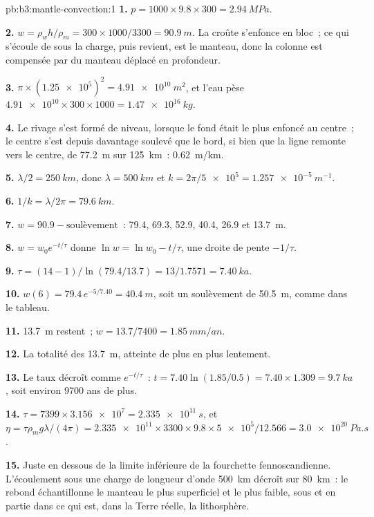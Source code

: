 \begin{solution}{pb:b3:mantle-convection:1}
\textbf{1.} $p = 1000\times9.8\times300 = \qty{2.94}{MPa}$.

\textbf{2.} $w = \rho_wh/\rho_m = 300\times1000/3300 = \qty{90.9}{m}$. La croûte
s'enfonce en bloc~; ce qui s'écoule de sous la charge, puis revient, est le
manteau, donc la colonne est compensée par du manteau déplacé en profondeur.

\textbf{3.} $\pi\times(\num{1.25e5})^2 = \qty{4.91e10}{m^2}$, et l'eau
pèse $\num{4.91e10}\times300\times1000 = \qty{1.47e16}{kg}$.

\textbf{4.} Le rivage s'est formé de niveau, lorsque le fond était le plus enfoncé au
centre~; le centre s'est depuis davantage soulevé que le bord, si bien que la ligne
remonte vers le centre, de \qty{77.2}{m} sur \qty{125}{km}~:
\qty{0.62}{m/km}.

\textbf{5.} $\lambda/2 = \qty{250}{km}$, donc $\lambda = \qty{500}{km}$ et $k =
2\pi/\num{5e5} = \qty{1.257e-5}{m^{-1}}$.

\textbf{6.} $1/k = \lambda/2\pi = \qty{79.6}{km}$.

\textbf{7.} $w = 90.9 - \text{soulèvement}$~: 79.4, 69.3, 52.9, 40.4, 26.9 et
\qty{13.7}{m}.

\textbf{8.} $w = w_0e^{-t/\tau}$ donne $\ln w = \ln w_0 - t/\tau$, une droite
de pente $-1/\tau$.

\textbf{9.} $\tau = (14 - 1)/\ln(79.4/13.7) = 13/1.7571 = \qty{7.40}{ka}$.

\textbf{10.} $w(6) = 79.4\,e^{-5/7.40} = \qty{40.4}{m}$, soit un soulèvement de
\qty{50.5}{m}, comme dans le tableau.

\textbf{11.} \qty{13.7}{m} restent~; $\dot w = 13.7/7400 = \qty{1.85}{mm/an}$.

\textbf{12.} La totalité des \qty{13.7}{m}, atteinte de plus en plus lentement.

\textbf{13.} Le taux décroît comme $e^{-t/\tau}$~: $t = 7.40\ln(1.85/0.5) =
7.40\times1.309 = \qty{9.7}{ka}$, soit environ 9700 ans de plus.

\textbf{14.} $\tau = 7399\times\num{3.156e7} = \qty{2.335e11}{s}$, et $\eta =
\tau\rho_mg\lambda/(4\pi) = \num{2.335e11}\times3300\times9.8\times\num{5e5}/
12.566 = \qty{3.0e20}{Pa.s}$.

\textbf{15.} Juste en dessous de la limite inférieure de la fourchette fennoscandienne. L'écoulement
sous une charge de longueur d'onde \qty{500}{km} décroît sur \qty{80}{km}~: le
rebond échantillonne le manteau le plus superficiel et le plus faible, sous et en partie dans ce qui
est, dans la Terre réelle, la lithosphère.


\end{solution}
